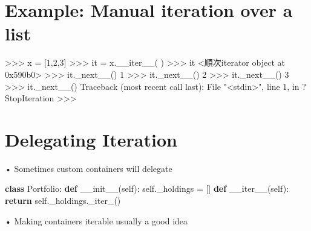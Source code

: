 \documentclass[
  letterpaper,
  DIV=11,
  numbers=noendperiod]{scrreprt}
\newenvironment{Shaded}{\begin{snugshade}}{\end{snugshade}}
\newcommand{\ControlFlowTok}[1]{\textcolor[rgb]{0.00,0.23,0.31}{\textbf{#1}}}
\newcommand{\FunctionTok}[1]{\textcolor[rgb]{0.28,0.35,0.67}{#1}}
\newcommand{\KeywordTok}[1]{\textcolor[rgb]{0.00,0.23,0.31}{\textbf{#1}}}
\newcommand{\NormalTok}[1]{\textcolor[rgb]{0.00,0.23,0.31}{#1}}
\newcommand{\OperatorTok}[1]{\textcolor[rgb]{0.37,0.37,0.37}{#1}}
\newcommand{\VariableTok}[1]{\textcolor[rgb]{0.07,0.07,0.07}{#1}}
\begin{document}

\chapter{Example: Manual iteration over a
list}\label{example-manual-iteration-over-a-list}

\begin{Shaded}
\begin{Highlighting}[]
\NormalTok{\textgreater{}\textgreater{}\textgreater{} x = [1,2,3]  }
\NormalTok{\textgreater{}\textgreater{}\textgreater{} it = x.\_\_iter\_\_(  )  }
\NormalTok{\textgreater{}\textgreater{}\textgreater{} it  }
\NormalTok{\textless{}順次iterator object at 0x590b0\textgreater{}  }
\NormalTok{\textgreater{}\textgreater{}\textgreater{} it.\_next\_\_()  }
\NormalTok{1  }
\NormalTok{\textgreater{}\textgreater{}\textgreater{} it.\_next\_\_()  }
\NormalTok{2  }
\NormalTok{\textgreater{}\textgreater{}\textgreater{} it.\_next\_\_()  }
\NormalTok{3  }
\NormalTok{\textgreater{}\textgreater{}\textgreater{} it.\_next\_\_()  }
\NormalTok{Traceback (most recent call last):  }
\NormalTok{    File "\textless{}stdin\textgreater{}", line 1, in ?  }
\NormalTok{StopIteration  }
\NormalTok{\textgreater{}\textgreater{}\textgreater{} }
\end{Highlighting}
\end{Shaded}


\chapter{Delegating Iteration}\label{delegating-iteration}

• Sometimes custom containers will delegate

\begin{Shaded}
\begin{Highlighting}[]
\KeywordTok{class}\NormalTok{ Portfolio: }\KeywordTok{def} \FunctionTok{\_\_init\_\_}\NormalTok{(}\VariableTok{self}\NormalTok{): }\VariableTok{self}\NormalTok{.\_holdings }\OperatorTok{=}\NormalTok{ [] }\KeywordTok{def} \FunctionTok{\_\_iter\_\_}\NormalTok{(}\VariableTok{self}\NormalTok{): }\ControlFlowTok{return} \VariableTok{self}\NormalTok{.\_holdings.\_iter\_() }
\end{Highlighting}
\end{Shaded}

• Making containers iterable usually a good idea
\end{document}
